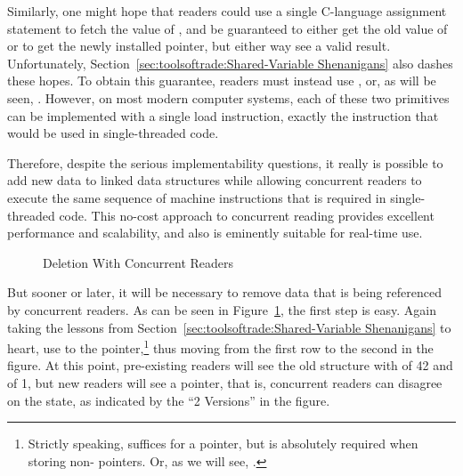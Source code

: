 Similarly, one might hope that readers could use a single C-language
assignment statement to fetch the value of , and be guaranteed
to either get the old value of  or to get the newly installed
pointer, but either way see a valid result.
Unfortunately, Section~\ref{sec:toolsoftrade:Shared-Variable Shenanigans}
also dashes these hopes.
To obtain this guarantee, readers must instead use ,
or, as will be seen, .
However, on most modern computer systems, each of these two primitives
can be implemented with a single load instruction, exactly the instruction
that would be used in single-threaded code.

Therefore, despite the serious implementability questions, it really
is possible to add new data to linked data structures while allowing
concurrent readers to execute the same sequence of machine instructions
that is required in single-threaded code.
This no-cost approach to concurrent reading provides excellent performance
and scalability, and also is eminently suitable for real-time use.

\begin{figure}[tb]
\centering
{}
\caption{Deletion With Concurrent Readers}
\label{fig:defer:Deletion With Concurrent Readers}
\end{figure}

But sooner or later, it will be necessary to remove data that is
being referenced by concurrent readers.
As can be seen in
Figure~\ref{fig:defer:Deletion With Concurrent Readers},
the first step is easy.
Again taking the lessons from
Section~\ref{sec:toolsoftrade:Shared-Variable Shenanigans}
to heart, use  to  the pointer,\footnote{
	Strictly speaking,  suffices for a 
	pointer, but  is absolutely required
	when storing non- pointers.
	Or, as we will see, .}
thus moving from the first row to the second in the figure.
At this point, pre-existing readers will see the old structure with
 of 42 and  of 1, but new readers will see
a  pointer, that is, concurrent readers can disagree on
the state, as indicated by the ``2 Versions'' in the figure.

